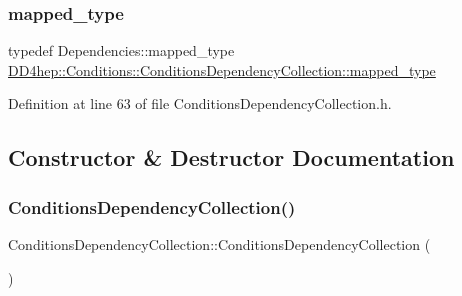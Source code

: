 \hypertarget{class_d_d4hep_1_1_conditions_1_1_conditions_dependency_collection_a406b7e79f4192c1d4ab1cdeb500d81f4}{}\label{class_d_d4hep_1_1_conditions_1_1_conditions_dependency_collection_a406b7e79f4192c1d4ab1cdeb500d81f4} 
\subsubsection{\texorpdfstring{mapped\+\_\+type}{mapped\_type}}
{\footnotesize\ttfamily typedef Dependencies\+::mapped\+\_\+type \hyperlink{class_d_d4hep_1_1_conditions_1_1_conditions_dependency_collection_a406b7e79f4192c1d4ab1cdeb500d81f4}{D\+D4hep\+::\+Conditions\+::\+Conditions\+Dependency\+Collection\+::mapped\+\_\+type}}



Definition at line 63 of file Conditions\+Dependency\+Collection.\+h.



\subsection{Constructor \& Destructor Documentation}
\hypertarget{class_d_d4hep_1_1_conditions_1_1_conditions_dependency_collection_af714a3d709ece6040aea1e4d65645015}{}\label{class_d_d4hep_1_1_conditions_1_1_conditions_dependency_collection_af714a3d709ece6040aea1e4d65645015} 
\subsubsection{\texorpdfstring{Conditions\+Dependency\+Collection()}{ConditionsDependencyCollection()}\hspace{0.1cm}{\footnotesize\ttfamily [1/2]}}
{\footnotesize\ttfamily Conditions\+Dependency\+Collection\+::\+Conditions\+Dependency\+Collection (\begin{DoxyParamCaption}{ }\end{DoxyParamCaption})}



